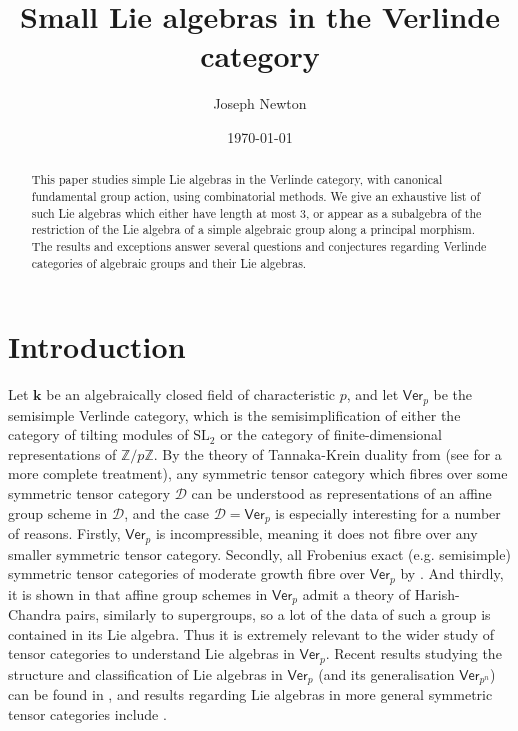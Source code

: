 \documentclass[11pt,a4paper,reqno]{amsart}
\theoremstyle{definition}
\newcommand{\bk}{\mathbf{k}}
\newcommand{\cD}{\mathcal{D}}
\numberwithin{equation}{section}
\newcommand{\Ver}{\mathsf{Ver}}
\newcommand{\mZ}{\mathbb{Z}}
\newcommand{\SL}{\mathrm{SL}}
\begin{document}
\title{Small Lie algebras in the Verlinde category}
\author{Joseph Newton}
\address{School of Mathematics and Statistics, University of Sydney, Australia}
\date{\today}

\keywords{}

\setcounter{tocdepth}{1}

\begin{abstract}
This paper studies simple Lie algebras in the Verlinde category, with canonical fundamental group action, using combinatorial methods. We give an exhaustive list of such Lie algebras which either have length at most 3, or appear as a subalgebra of the restriction of the Lie algebra of a simple algebraic group along a principal morphism. The results and exceptions answer several questions and conjectures regarding Verlinde categories of algebraic groups and their Lie algebras.
\end{abstract}

\maketitle

\tableofcontents

\section*{Introduction}

Let $\bk$ be an algebraically closed field of characteristic $p$, and let $\Ver_p$ be the semisimple Verlinde category, which is the semisimplification of either the category of tilting modules of $\SL_2$ or the category of finite-dimensional representations of $\mZ/p\mZ$. By the theory of Tannaka-Krein duality from \cite{De} (see \cite[\S4]{incompressible} for a more complete treatment), any symmetric tensor category which fibres over some symmetric tensor category $\cD$ can be understood as representations of an affine group scheme in $\cD$, and the case $\cD=\Ver_p$ is especially interesting for a number of reasons. Firstly, $\Ver_p$ is incompressible, meaning it does not fibre over any smaller symmetric tensor category. Secondly, all Frobenius exact (e.g. semisimple) symmetric tensor categories of moderate growth fibre over $\Ver_p$ by \cite{frobenius}. And thirdly, it is shown in \cite{Ve1} that affine group schemes in $\Ver_p$ admit a theory of Harish-Chandra pairs, similarly to supergroups, so a lot of the data of such a group is contained in its Lie algebra. Thus it is extremely relevant to the wider study of tensor categories to understand Lie algebras in $\Ver_p$. Recent results studying the structure and classification of Lie algebras in $\Ver_p$ (and its generalisation $\Ver_{p^n}$) can be found in \cite{CEN,EKO,Hu}, and results regarding Lie algebras in more general symmetric tensor categories include \cite{APS,BP}.
\end{document}
